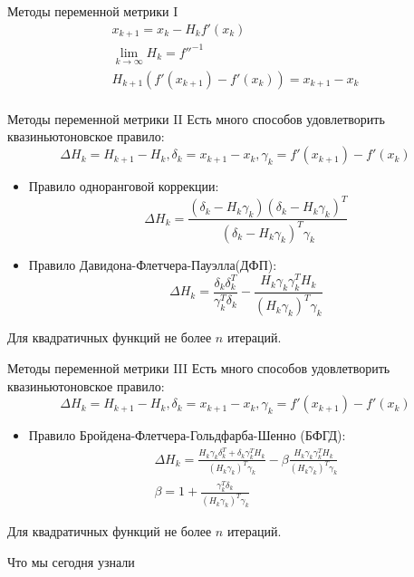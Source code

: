 \documentclass[14pt, fleqn, xcolor={dvipsnames, table}]{beamer}
\begin{document}
\begin{frame}{Методы переменной метрики I}
$$\begin{array}{l}
x_{k+1} = x_k - H_kf'(x_k)\\
\lim_{k \to \infty} H_k = f''^{-1}\\
H_{k+1}(f'(x_{k+1}) - f'(x_k)) = x_{k+1} - x_k \\
\end{array}$$
\end{frame}

\begin{frame}{Методы переменной метрики II}
\small
Есть много способов удовлетворить квазиньютоновское правило:
$$
  \Delta H_k = H_{k+1} - H_k, \delta_k = x_{k+1} - x_k, \gamma_k = f'(x_{k+1}) - f'(x_k)
$$
\begin{itemize}
  \item Правило одноранговой коррекции:
  $$
    \Delta H_k = \frac{(\delta_k - H_k\gamma_k)(\delta_k - H_k\gamma_k)^T}{(\delta_k - H_k\gamma_k)^T\gamma_k}
  $$
  \item Правило Давидона-Флетчера-Пауэлла(ДФП):
  $$
    \Delta H_k = \frac{\delta_k\delta_{k}^{T}}{\gamma_{k}^{T}\delta_k} - \frac{H_k\gamma_k\gamma_{k}^{T}H_k}{(H_k\gamma_k)^T\gamma_k}
  $$
\end{itemize}
Для квадратичных функций не более $n$ итераций.
\end{frame}

\begin{frame}{Методы переменной метрики III}
\small
Есть много способов удовлетворить квазиньютоновское правило:
$$
  \Delta H_k = H_{k+1} - H_k, \delta_k = x_{k+1} - x_k, \gamma_k = f'(x_{k+1}) - f'(x_k)
$$
\begin{itemize}
  \item Правило Бройдена-Флетчера-Гольдфарба-Шенно (БФГД):
  $$\begin{array}{l}
    \Delta H_k = \frac{H_k\gamma_k\delta_{k}^{T} + \delta_k\gamma_{k}^{T}H_k}{(H_k\gamma_k)^T\gamma_k} - \beta\frac{H_k\gamma_k\gamma_{k}^{T}H_k}{(H_k\gamma_k)^T\gamma_k} \\
    \beta = 1 + \frac{\gamma_{k}^{T}\delta_k}{(H_k\gamma_k)^T\gamma_k}
  \end{array}$$
\end{itemize}
Для квадратичных функций не более $n$ итераций.
\end{frame}

\begin{frame}{Что мы сегодня узнали}

\end{frame}
\end{document}
